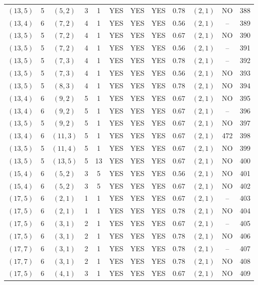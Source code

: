 \begin{longtable}{|c|c|c|c|c|c|c|c|c|c|c|c|}
$(13,5)$ & 5 & $(5,2)$ & 3 & 1 & YES & YES & YES & $0.78$ & $(2,1)$ & NO & 388\\
$(13,4)$ & 6 & $(7,2)$ & 4 & 1 & YES & YES & YES & $0.56$ & $(2,1)$ & -- & 389\\
$(13,5)$ & 5 & $(7,2)$ & 4 & 1 & YES & YES & YES & $0.67$ & $(2,1)$ & NO & 390\\
$(13,5)$ & 5 & $(7,2)$ & 4 & 1 & YES & YES & YES & $0.56$ & $(2,1)$ & -- & 391\\
$(13,5)$ & 5 & $(7,3)$ & 4 & 1 & YES & YES & YES & $0.78$ & $(2,1)$ & -- & 392\\
$(13,5)$ & 5 & $(7,3)$ & 4 & 1 & YES & YES & YES & $0.56$ & $(2,1)$ & NO & 393\\
$(13,5)$ & 5 & $(8,3)$ & 4 & 1 & YES & YES & YES & $0.78$ & $(2,1)$ & NO & 394\\
$(13,4)$ & 6 & $(9,2)$ & 5 & 1 & YES & YES & YES & $0.67$ & $(2,1)$ & NO & 395\\
$(13,4)$ & 6 & $(9,2)$ & 5 & 1 & YES & YES & YES & $0.67$ & $(2,1)$ & -- & 396\\
$(13,5)$ & 5 & $(9,2)$ & 5 & 1 & YES & YES & YES & $0.67$ & $(2,1)$ & NO & 397\\
$(13,4)$ & 6 & $(11,3)$ & 5 & 1 & YES & YES & YES & $0.67$ & $(2,1)$ & 472 & 398\\
$(13,5)$ & 5 & $(11,4)$ & 5 & 1 & YES & YES & YES & $0.67$ & $(2,1)$ & NO & 399\\
$(13,5)$ & 5 & $(13,5)$ & 5 & 13 & YES & YES & YES & $0.67$ & $(2,1)$ & NO & 400\\
$(15,4)$ & 6 & $(5,2)$ & 3 & 5 & YES & YES & YES & $0.56$ & $(2,1)$ & NO & 401\\
$(15,4)$ & 6 & $(5,2)$ & 3 & 5 & YES & YES & YES & $0.67$ & $(2,1)$ & NO & 402\\
$(17,5)$ & 6 & $(2,1)$ & 1 & 1 & YES & YES & YES & $0.67$ & $(2,1)$ & -- & 403\\
$(17,5)$ & 6 & $(2,1)$ & 1 & 1 & YES & YES & YES & $0.78$ & $(2,1)$ & NO & 404\\
$(17,5)$ & 6 & $(3,1)$ & 2 & 1 & YES & YES & YES & $0.67$ & $(2,1)$ & -- & 405\\
$(17,5)$ & 6 & $(3,1)$ & 2 & 1 & YES & YES & YES & $0.78$ & $(2,1)$ & NO & 406\\
$(17,7)$ & 6 & $(3,1)$ & 2 & 1 & YES & YES & YES & $0.78$ & $(2,1)$ & -- & 407\\
$(17,7)$ & 6 & $(3,1)$ & 2 & 1 & YES & YES & YES & $0.78$ & $(2,1)$ & NO & 408\\
$(17,5)$ & 6 & $(4,1)$ & 3 & 1 & YES & YES & YES & $0.67$ & $(2,1)$ & NO & 409\\

\end{longtable}
